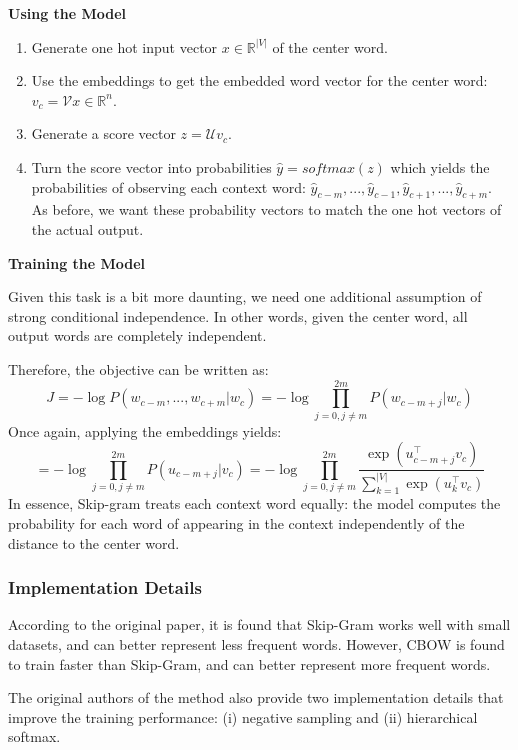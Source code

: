 \documentclass[
]{book}
\providecommand{\tightlist}{%
  \setlength{\itemsep}{0pt}\setlength{\parskip}{0pt}}
\begin{document}
\textbf{Using the Model }

\begin{enumerate}
\def\labelenumi{\arabic{enumi}.}
\tightlist
\item
  Generate one hot input vector \(x\in\mathbb{R}^{|V|}\) of the center word.
\item
  Use the embeddings to get the embedded word vector for the center word: \(v_c = \mathcal{V}x\in \mathbb{R}^n\).
\item
  Generate a score vector \(z=\mathcal{U}v_c\).
\item
  Turn the score vector into probabilities \(\hat{y} = softmax(z)\) which yields the probabilities of observing each context word: \(\hat{y}_{c-m}, ..., \hat{y}_{c-1}, \hat{y}_{c+1}, ..., \hat{y}_{c+m}\). As before, we want these probability vectors to match the one hot vectors of the actual output.
\end{enumerate}

\textbf{Training the Model}

Given this task is a bit more daunting, we need one additional assumption of strong conditional independence. In other words, given the center word, all output words are completely independent.

Therefore, the objective can be written as:
\[
J = -\log P(w_{c-m}, ..., w_{c+m}|w_c) = -\log \prod_{j=0, j\neq m}^{2m} P(w_{c-m+j} | w_c)
\]
Once again, applying the embeddings yields:
\[
=-\log \prod_{j=0, j\neq m}^{2m} P(u_{c-m+j} | v_c) = -\log \prod_{j=0,j\neq m}^{2m} \frac{\exp(u_{c-m+j}^\top v_c)}{\sum_{k=1}^{|V|}\exp(u_{k}^\top v_c)}
\]
In essence, Skip-gram treats each context word equally: the model computes the probability for each word of appearing in the context independently of the distance to the center word.

\hypertarget{implementation-details}{%
\subsubsection{Implementation Details}\label{implementation-details}}

According to the original paper, it is found that Skip-Gram works well with small datasets, and can better represent less frequent words. However, CBOW is found to train faster than Skip-Gram, and can better represent more frequent words.

The original authors of the method also provide two implementation details that improve the training performance: (i) negative sampling and (ii) hierarchical softmax.
\end{document}
